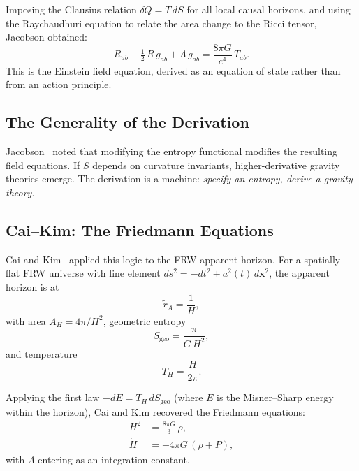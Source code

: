 \documentclass[11pt]{article}
\begin{document}
Imposing the Clausius relation $\delta Q = T\,dS$ for all local causal
horizons, and using the Raychaudhuri equation to relate the area change to the
Ricci tensor, Jacobson obtained:
\begin{equation}
R_{ab} - \tfrac{1}{2}\,R\,g_{ab} + \Lambda\,g_{ab} = \frac{8\pi G}{c^4}\,T_{ab}.
\label{eq:einstein}
\end{equation}
This is the Einstein field equation, derived as an equation of state rather
than from an action principle.

\subsection{The Generality of the Derivation}

Jacobson~\citep{Jacobson1995} noted that modifying the entropy functional
modifies the resulting field equations.  If $S$ depends on curvature invariants,
higher-derivative gravity theories emerge.  The derivation is a machine:
\emph{specify an entropy, derive a gravity theory}.

\subsection{Cai--Kim: The Friedmann Equations}

Cai and Kim~\citep{CaiKim2005} applied this logic to the FRW apparent
horizon.  For a spatially flat FRW universe with line element
$ds^2 = -dt^2 + a^2(t)\,d\mathbf{x}^2$, the apparent horizon is at
\begin{equation}
\tilde{r}_A = \frac{1}{H},
\label{eq:apparent_horizon}
\end{equation}
with area $A_H = 4\pi/H^2$, geometric entropy
\begin{equation}
S_\mathrm{geo} = \frac{\pi}{G\,H^2},
\label{eq:Sgeo}
\end{equation}
and temperature
\begin{equation}
T_H = \frac{H}{2\pi}.
\label{eq:T_horizon}
\end{equation}

Applying the first law $-dE = T_H\,dS_\mathrm{geo}$ (where $E$ is the
Misner--Sharp energy within the horizon), Cai and Kim recovered the
Friedmann equations:
\begin{align}
H^2 &= \frac{8\pi G}{3}\,\rho, \label{eq:friedmann1}\\
\dot{H} &= -4\pi G\,(\rho + P), \label{eq:friedmann2}
\end{align}
with $\Lambda$ entering as an integration constant.
\end{document}
